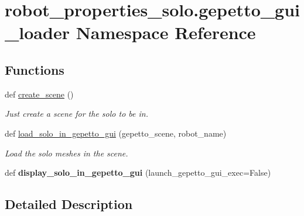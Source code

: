\hypertarget{namespacerobot__properties__solo_1_1gepetto__gui__loader}{}\section{robot\+\_\+properties\+\_\+solo.\+gepetto\+\_\+gui\+\_\+loader Namespace Reference}
\label{namespacerobot__properties__solo_1_1gepetto__gui__loader}
\subsection*{Functions}
\begin{DoxyCompactItemize}
\item 
def \hyperlink{namespacerobot__properties__solo_1_1gepetto__gui__loader_a552eee4251af98b68b22f20984ac8633}{create\+\_\+scene} ()\hypertarget{namespacerobot__properties__solo_1_1gepetto__gui__loader_a552eee4251af98b68b22f20984ac8633}{}\label{namespacerobot__properties__solo_1_1gepetto__gui__loader_a552eee4251af98b68b22f20984ac8633}

\begin{DoxyCompactList}\small\item\em Just create a scene for the solo to be in. \end{DoxyCompactList}\item 
def \hyperlink{namespacerobot__properties__solo_1_1gepetto__gui__loader_a7b944d6d04d91f7c56ead955046b7e93}{load\+\_\+solo\+\_\+in\+\_\+gepetto\+\_\+gui} (gepetto\+\_\+scene, robot\+\_\+name)\hypertarget{namespacerobot__properties__solo_1_1gepetto__gui__loader_a7b944d6d04d91f7c56ead955046b7e93}{}\label{namespacerobot__properties__solo_1_1gepetto__gui__loader_a7b944d6d04d91f7c56ead955046b7e93}

\begin{DoxyCompactList}\small\item\em Load the solo meshes in the scene. \end{DoxyCompactList}\item 
def {\bfseries display\+\_\+solo\+\_\+in\+\_\+gepetto\+\_\+gui} (launch\+\_\+gepetto\+\_\+gui\+\_\+exec=False)\hypertarget{namespacerobot__properties__solo_1_1gepetto__gui__loader_a337189b9a5afcb6de702c204cafbb9b7}{}\label{namespacerobot__properties__solo_1_1gepetto__gui__loader_a337189b9a5afcb6de702c204cafbb9b7}

\end{DoxyCompactItemize}


\subsection{Detailed Description}
\begin{DoxyVerb}\end{DoxyVerb}
 